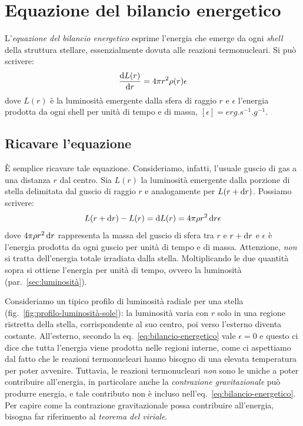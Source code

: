 \section{Equazione del bilancio energetico}\label{sec:bilancio-energetico}
L'\emph{equazione del bilancio energetico} esprime l'energia che emerge da ogni \emph{shell} della struttura stellare, essenzialmente dovuta alle reazioni termonucleari. Si può scrivere:
\begin{equation}\label{eq:bilancio-energetico}
    \dfrac{\mathop{\mathrm{{}d}}\mathopen{} L(r)}{\mathop{\mathrm{{}d}}\mathopen{} r} = 4 \pi r^2 \rho(r) \epsilon
\end{equation}
dove $L(r)$ è la luminosità emergente dalla sfera di raggio $r$ e $\epsilon$ l'energia prodotta da ogni shell per unità di tempo e di massa, $[\epsilon] = \si{erg.s^{-1}.g^{-1}}$.

\subsection{Ricavare l'equazione}
È semplice ricavare tale equazione. Consideriamo, infatti, l'usuale guscio di gas a una distanza $r$ dal centro. Sia $L(r)$ la luminosità emergente dalla porzione di stella delimitata dal guscio di raggio $r$ e analogamente per $L(r + \mathop{\mathrm{{}d}}\mathopen{} r)$. Possiamo scrivere:
\[
L(r + \mathop{\mathrm{{}d}}\mathopen{} r) - L(r) = \mathop{\mathrm{{}d}}\mathopen{} L(r) = 4 \pi \rho r^2 \mathop{\mathrm{{}d}}\mathopen{} r \epsilon
\]
dove $4 \pi \rho r^2 \mathop{\mathrm{{}d}}\mathopen{} r$ rappresenta la massa del guscio di sfera tra $r$ e $r + \mathop{\mathrm{{}d}}\mathopen{} r$ e $\epsilon$ è l'energia prodotta da ogni guscio per unità di tempo e di massa. Attenzione, \emph{non} si tratta dell'energia totale irradiata dalla stella. Moltiplicando le due quantità sopra si ottiene l'energia per unità di tempo, ovvero la luminosità (par.~\ref{sec:luminosità}).

Consideriamo un tipico profilo di luminosità radiale per una stella (fig.~\ref{fig:profilo-luminosità-sole}): la luminosità varia con $r$ solo in una regione ristretta della stella, corrispondente al suo centro, poi verso l'esterno diventa costante. All'esterno, secondo la eq.~\eqref{eq:bilancio-energetico} vale $\epsilon = 0$ e questo ci dice che tutta l'energia viene prodotta nelle regioni interne, come ci aspettiamo dal fatto che le reazioni termonucleari hanno bisogno di una elevata temperatura per poter avvenire. Tuttavia, le reazioni termonucleari \emph{non} sono le uniche a poter contribuire all'energia, in particolare anche la \emph{contrazione gravitazionale} può produrre energia, e tale contributo non è incluso nell'eq.~\eqref{eq:bilancio-energetico}. Per capire come la contrazione gravitazionale possa contribuire all'energia, bisogna far riferimento al \emph{teorema del viriale}.

